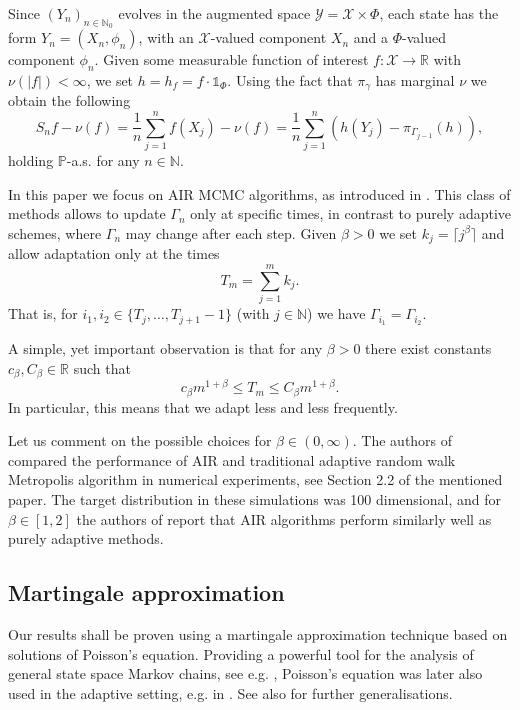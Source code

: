 \documentclass[12pt]{article}
\theoremstyle{definition}
\newcommand{\N}{\mathbb{N}}
\newcommand{\R}{\mathbb{R}}
\newcommand{\cX}{\mathcal{X}}
\newcommand{\cY}{\mathcal{Y}}
\begin{document}
Since $(Y_n)_{n \in \N_0}$ evolves in the augmented space $\cY = \cX \times \Phi$, each state has the form $Y_n = (X_n, \phi_n)$, with an $\cX$-valued component $X_n$ and a $\Phi$-valued component $\phi_n$.
Given some measurable function of interest $f \colon \cX \to \R$ with $\nu(\vert f \vert) < \infty $, we set $h= h_f = f \cdot \mathds{1}_\Phi$. 
Using the fact that $\pi_\gamma$ has marginal $\nu$ we obtain the following 
\begin{equation}\label{equ:S_n_on_augmented_space}
	S_n f - \nu(f) = \frac{1}{n}\sum_{j=1}^n f(X_j) - \nu(f)= \frac{1}{n}\sum_{j=1}^n \left( h(Y_j) - {\pi}_{\Gamma_{j-1}}(h)\right),
\end{equation}
holding $\mathbb{P}$-a.s. for any $n\in \N$. 

In this paper we focus on AIR MCMC algorithms, as introduced in \cite{chimisov2018air}.
This class of methods allows to update $\Gamma_n$ only at specific times, in contrast to purely adaptive schemes, where $\Gamma_n$ may change after each step.
Given $\beta>0$ we set $k_j = \lceil j^\beta \rceil$ and allow adaptation only at the times 
\[
T_m = \sum_{j=1}^m k_j.
\]
That is, for $i_1, i_2 \in \{ T_j , \dots, T_{j+1}-1\}$ (with $j \in \N$) we have $\Gamma_{i_1} = \Gamma_{i_2}$.  

A simple, yet important observation is that for any $\beta>0$ there exist constants $c_\beta, C_\beta \in \R$ such that 
\begin{equation}\label{equ:AIR_MCMC_steps_bound}
	c_\beta m^{1+\beta}  \leq 
	T_m \leq C_\beta m^{1+\beta}.
\end{equation}
In particular, this means that we adapt less and less frequently. 



Let us comment on the possible choices for $\beta \in (0, \infty)$. The authors of \cite{chimisov2018air} compared the performance of	AIR and traditional adaptive random walk Metropolis algorithm in numerical experiments, see Section 2.2 of the mentioned paper. The target distribution in these simulations was 100 dimensional, and for $\beta \in [1,2]$ the authors of \cite{chimisov2018air} report that AIR algorithms perform similarly well as purely adaptive methods.


\subsection{Martingale approximation}
Our results shall be proven using a martingale approximation technique based on solutions of Poisson's equation.  
Providing a powerful tool for the analysis of general state space Markov chains, see e.g. \cite{meyn2012markov,douc2018markov}, Poisson's equation was later also used in the adaptive setting, e.g. in \cite{andrieu2006ergodicity,saksman2010ergodicity,atchade2013Bayesian}. See also \cite{atchade2010limit,atchade2012limit} for further generalisations.
\end{document}
